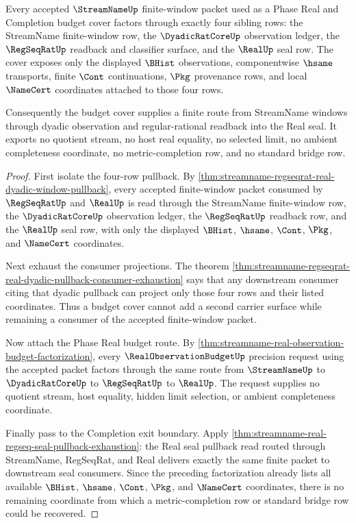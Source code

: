 \begin{theorem}
\label{thm:streamname-regseqrat-realup-lattice-budget-cover}
Every accepted $\StreamNameUp$ finite-window packet used as a Phase Real and
Completion budget cover factors through exactly four sibling rows: the
StreamName finite-window row, the $\DyadicRatCoreUp$ observation ledger, the
$\RegSeqRatUp$ readback and classifier surface, and the $\RealUp$ seal row.
The cover exposes only the displayed $\BHist$ observations, componentwise
$\hsame$ transports, finite $\Cont$ continuations, $\Pkg$ provenance rows, and
local $\NameCert$ coordinates attached to those four rows.

Consequently the budget cover supplies a finite route from StreamName windows
through dyadic observation and regular-rational readback into the Real seal.
It exports no quotient stream, no host real equality, no selected limit, no
ambient completeness coordinate, no metric-completion row, and no standard
bridge row.
\end{theorem}
\begin{proof}
First isolate the four-row pullback. By
\autoref{thm:streamname-regseqrat-real-dyadic-window-pullback}, every accepted
finite-window packet consumed by $\RegSeqRatUp$ and $\RealUp$ is read through
the StreamName finite-window row, the $\DyadicRatCoreUp$ observation ledger,
the $\RegSeqRatUp$ readback row, and the $\RealUp$ seal row, with only the
displayed $\BHist$, $\hsame$, $\Cont$, $\Pkg$, and $\NameCert$ coordinates.

Next exhaust the consumer projections. The theorem
\autoref{thm:streamname-regseqrat-real-dyadic-pullback-consumer-exhaustion}
says that any downstream consumer citing that dyadic pullback can project only
those four rows and their listed coordinates. Thus a budget cover cannot add a
second carrier surface while remaining a consumer of the accepted
finite-window packet.

Now attach the Phase Real budget route. By
\autoref{thm:streamname-real-observation-budget-factorization}, every
$\RealObservationBudgetUp$ precision request using the accepted packet factors
through the same route from $\StreamNameUp$ to $\DyadicRatCoreUp$ to
$\RegSeqRatUp$ to $\RealUp$. The request supplies no quotient stream, host
equality, hidden limit selection, or ambient completeness coordinate.

Finally pass to the Completion exit boundary. Apply
\autoref{thm:streamname-real-regseq-seal-pullback-exhaustion}: the Real seal
pullback read routed through StreamName, RegSeqRat, and Real delivers exactly
the same finite packet to downstream seal consumers. Since the preceding
factorization already lists all available $\BHist$, $\hsame$, $\Cont$, $\Pkg$,
and $\NameCert$ coordinates, there is no remaining coordinate from which a
metric-completion row or standard bridge row could be recovered.
\end{proof}
